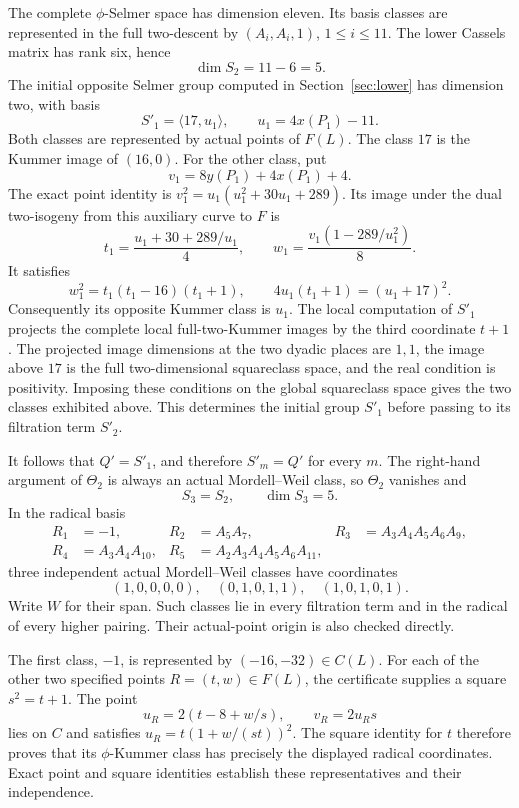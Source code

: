 \documentclass[11pt,a4paper]{article}
\theoremstyle{definition}\newtheorem{definition}[theorem]{Definition}
\theoremstyle{remark}\newtheorem{remark}[theorem]{Remark}
\begin{document}
The complete $\phi$-Selmer space has dimension eleven.  Its basis classes
are represented in the full two-descent by $(A_i,A_i,1)$,
$1\leq i\leq11$.  The lower Cassels matrix has rank six, hence
\[
 \dim S_2=11-6=5.
\]
The initial opposite Selmer group computed in Section~\ref{sec:lower} has dimension two, with basis
\[
 S'_1=\langle 17,u_1\rangle,\qquad u_1=4x(P_1)-11.
\]
Both classes are represented by actual points of $F(L)$.  The class $17$
is the Kummer image of $(16,0)$.  For the other class, put
\[
 v_1=8y(P_1)+4x(P_1)+4.
\]
The exact point identity is
$v_1^2=u_1(u_1^2+30u_1+289)$.  Its image under the dual two-isogeny from
this auxiliary curve to $F$ is
\[
 t_1=\frac{u_1+30+289/u_1}{4},\qquad
 w_1=\frac{v_1(1-289/u_1^2)}8.
\]
It satisfies
\[
 w_1^2=t_1(t_1-16)(t_1+1),\qquad
 4u_1(t_1+1)=(u_1+17)^2.
\]
Consequently its opposite Kummer class is $u_1$. The local computation of $S'_1$ projects the complete local full-two-Kummer images by the third coordinate $t+1$. The projected image dimensions at the two dyadic places are $1,1$, the image above $17$ is the full two-dimensional squareclass space, and the real condition is positivity. Imposing these conditions on the global squareclass space gives the two classes exhibited above. This determines the initial group $S'_1$ before passing to its filtration term $S'_2$.

It follows that $Q'=S'_1$, and therefore $S'_m=Q'$ for every $m$.
The right-hand argument of $\Theta_2$ is always an actual
Mordell--Weil class, so $\Theta_2$ vanishes and
\[
 S_3=S_2,\qquad \dim S_3=5.
\]
In the radical basis
\[
\begin{aligned}
 R_1&=-1,& R_2&=A_5A_7,& R_3&=A_3A_4A_5A_6A_9,\\
 R_4&=A_3A_4A_{10},&
 R_5&=A_2A_3A_4A_5A_6A_{11},
\end{aligned}
\]
three independent actual Mordell--Weil classes have coordinates
\[
 (1,0,0,0,0),\quad(0,1,0,1,1),\quad(1,0,1,0,1).
\]
Write $W$ for their span.  Such classes lie in every filtration term
and in the radical of every higher pairing.
Their actual-point origin is also checked directly.  

The first class,
$-1$, is represented by $(-16,-32)\in C(L)$.  For each of the other
two specified points $R=(t,w)\in F(L)$, the certificate supplies a square
$s^2=t+1$.  The point
\[
 u_R=2(t-8+w/s),\qquad v_R=2u_Rs
\]
lies on $C$ and satisfies
$u_R=t(1+w/(st))^2$.
The square identity for $t$ therefore proves that its
$\phi$-Kummer class has precisely the displayed radical coordinates.
Exact point and square identities establish these representatives and their independence.
\end{document}
